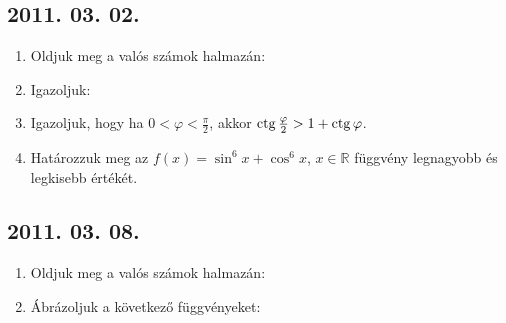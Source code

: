 \subsection*{2011. 03. 02.}
\begin{enumerate}
\item Oldjuk meg a valós számok halmazán:
\item Igazoljuk:
\item Igazoljuk, hogy ha $0<\varphi<\frac{\pi}{2}$, akkor $\mathop{\mathrm{ctg}}\nolimits\frac{\varphi}{2}>1+\mathop{\mathrm{ctg}}\nolimits\varphi$.
\item Határozzuk meg az $f(x)=\sin^6 x+\cos^6 x$, $x\in\mathbb R$ függvény legnagyobb és legkisebb értékét.
\end{enumerate}

\subsection*{2011. 03. 08.}
\begin{enumerate}
\item Oldjuk meg a valós számok halmazán:
\item Ábrázoljuk a következő függvényeket:
\end{enumerate}

